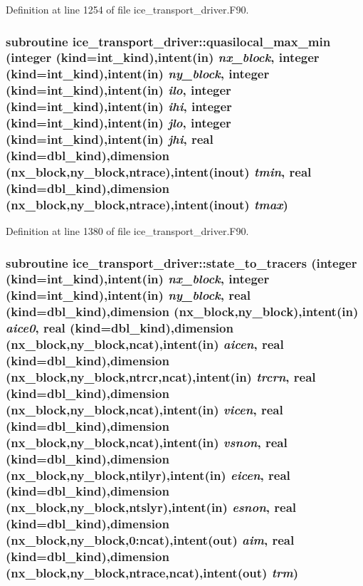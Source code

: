 Definition at line 1254 of file ice\_\-transport\_\-driver.F90.\hypertarget{namespaceice__transport__driver_a67ed05a8905e21d57703a31ede8ead61}{
\subsubsection[{quasilocal\_\-max\_\-min}]{\setlength{\rightskip}{0pt plus 5cm}subroutine ice\_\-transport\_\-driver::quasilocal\_\-max\_\-min (integer (kind=int\_\-kind),intent(in) {\em nx\_\-block}, \/  integer (kind=int\_\-kind),intent(in) {\em ny\_\-block}, \/  integer (kind=int\_\-kind),intent(in) {\em ilo}, \/  integer (kind=int\_\-kind),intent(in) {\em ihi}, \/  integer (kind=int\_\-kind),intent(in) {\em jlo}, \/  integer (kind=int\_\-kind),intent(in) {\em jhi}, \/  real (kind=dbl\_\-kind),dimension (nx\_\-block,ny\_\-block,ntrace),intent(inout) {\em tmin}, \/  real (kind=dbl\_\-kind),dimension (nx\_\-block,ny\_\-block,ntrace),intent(inout) {\em tmax})}}
\label{namespaceice__transport__driver_a67ed05a8905e21d57703a31ede8ead61}


Definition at line 1380 of file ice\_\-transport\_\-driver.F90.\hypertarget{namespaceice__transport__driver_a9820a25e1c9c417a464cd9127254edab}{
\subsubsection[{state\_\-to\_\-tracers}]{\setlength{\rightskip}{0pt plus 5cm}subroutine ice\_\-transport\_\-driver::state\_\-to\_\-tracers (integer (kind=int\_\-kind),intent(in) {\em nx\_\-block}, \/  integer (kind=int\_\-kind),intent(in) {\em ny\_\-block}, \/  real (kind=dbl\_\-kind),dimension (nx\_\-block,ny\_\-block),intent(in) {\em aice0}, \/  real (kind=dbl\_\-kind),dimension (nx\_\-block,ny\_\-block,ncat),intent(in) {\em aicen}, \/  real (kind=dbl\_\-kind),dimension (nx\_\-block,ny\_\-block,ntrcr,ncat),intent(in) {\em trcrn}, \/  real (kind=dbl\_\-kind),dimension (nx\_\-block,ny\_\-block,ncat),intent(in) {\em vicen}, \/  real (kind=dbl\_\-kind),dimension (nx\_\-block,ny\_\-block,ncat),intent(in) {\em vsnon}, \/  real (kind=dbl\_\-kind),dimension (nx\_\-block,ny\_\-block,ntilyr),intent(in) {\em eicen}, \/  real (kind=dbl\_\-kind),dimension (nx\_\-block,ny\_\-block,ntslyr),intent(in) {\em esnon}, \/  real (kind=dbl\_\-kind),dimension (nx\_\-block,ny\_\-block,0:ncat),intent(out) {\em aim}, \/  real (kind=dbl\_\-kind),dimension (nx\_\-block,ny\_\-block,ntrace,ncat),intent(out) {\em trm})}}
\label{namespaceice__transport__driver_a9820a25e1c9c417a464cd9127254edab}



